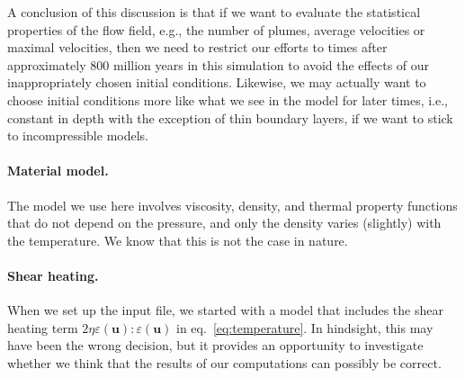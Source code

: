 \documentclass{article}
\begin{document}
A conclusion of this discussion is that if we want to evaluate the statistical
properties of the flow field, e.g., the number of plumes, average velocities or
maximal velocities, then we need to restrict our efforts to times after
approximately 800 million years in this simulation to avoid the effects of our
inappropriately chosen initial conditions. Likewise, we may actually want to
choose initial conditions more like what we see in the model for later times,
i.e., constant in depth with the exception of thin boundary layers, if we want
to stick to incompressible models.

\paragraph{Material model.}
The model we use here involves viscosity, density, and thermal property
functions that do not depend on the pressure, and only the density varies
(slightly) with the temperature. We know that this is not the case in nature.

\paragraph{Shear heating.}
When we set up the input file, we started with a model that includes the
shear heating term $2\eta \varepsilon(\mathbf u):\varepsilon(\mathbf u)$ in
eq.~\eqref{eq:temperature}. In hindsight, this may have been the wrong decision,
but it provides an opportunity to investigate whether we think that the results of our
computations can possibly be correct.
\end{document}
